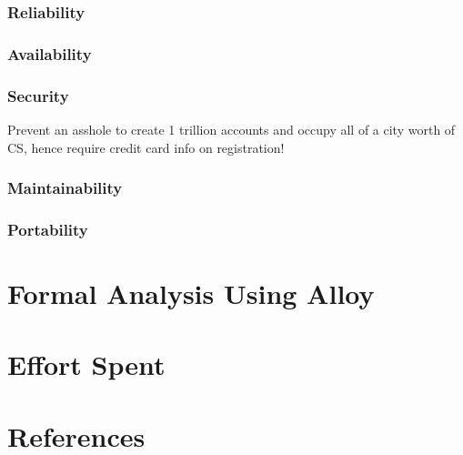 \documentclass[11pt]{article}
\begin{document}
\subsubsection{Reliability}

\subsubsection{Availability}

\subsubsection{Security}

Prevent an asshole to create 1 trillion accounts and occupy all of a city worth of CS, hence require credit card info on registration!

\subsubsection{Maintainability}

\subsubsection{Portability}

\section{Formal Analysis Using Alloy}
\label{section:alloy}

\section{Effort Spent}
\label{section:effort}

\section{References}
\label{section:references}
\end{document}
